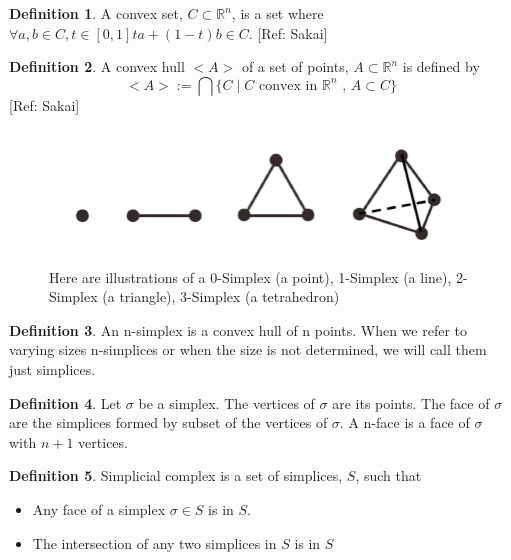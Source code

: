 \documentclass[12pt, a4paper, twocolumn, fullpage]{article}
\theoremstyle{plain}
\theoremstyle{definition}
\newtheorem{defn}{Definition}[section]
\theoremstyle{remark}
\begin{document}
\begin{defn}
A convex set, $C \subset \mathbb{R}^n$, is a set where $\forall a,b \in C, t \in [0,1] ta+(1-t)b \in C$. [Ref: Sakai]
\end{defn}

\begin{defn}
A convex hull $<A>$ of a set of points, $A \subset \mathbb{R}^n$ is defined by 
$$<A> := \bigcap \{C \mid C \text{ convex in } \mathbb{R}^n \text{ , } A\subset C \} $$
[Ref: Sakai]
\end{defn}

\begin{figure}[t]
    \includegraphics[width=\linewidth]{img/mathDef/simplex.png}
    \caption{Here are illustrations of a 0-Simplex (a point), 1-Simplex (a line), 2-Simplex (a triangle), 3-Simplex (a tetrahedron)}
    \label{Simplex}
\end{figure}

\begin{defn}
An n-simplex is a convex hull of n points. When we refer to varying sizes n-simplices or when the size is not determined, we will call them just simplices.
\end{defn}

\begin{defn}
Let $\sigma$ be a simplex.
The vertices of $\sigma$ are its points.
The face of $\sigma$ are the simplices formed by subset of the vertices of $\sigma$.
A n-face is a face of $\sigma$ with $n+1$ vertices.
\end{defn}

\begin{defn}
Simplicial complex is a set of simplices, $S $, such that 
\begin{itemize}
    \item Any face of a simplex $\sigma \in S$ is in $S$.
    \item The intersection of any two simplices in $ S $ is in $ S $
\end{itemize}
\end{defn}
\end{document}
